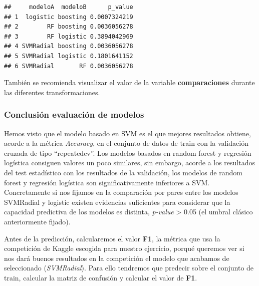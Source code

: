 \documentclass[]{article}
\newenvironment{Shaded}{\begin{snugshade}}{\end{snugshade}}
\newcommand{\DataTypeTok}[1]{\textcolor[rgb]{0.13,0.29,0.53}{#1}}
\newcommand{\KeywordTok}[1]{\textcolor[rgb]{0.13,0.29,0.53}{\textbf{#1}}}
\newcommand{\NormalTok}[1]{#1}
\newcommand{\OperatorTok}[1]{\textcolor[rgb]{0.81,0.36,0.00}{\textbf{#1}}}
\newcommand{\StringTok}[1]{\textcolor[rgb]{0.31,0.60,0.02}{#1}}
\begin{document}
\begin{verbatim}
##     modeloA  modeloB      p_value
## 1  logistic boosting 0.0007324219
## 2        RF boosting 0.0036056278
## 3        RF logistic 0.3894042969
## 4 SVMRadial boosting 0.0036056278
## 5 SVMRadial logistic 0.1801641152
## 6 SVMRadial       RF 0.0036056278
\end{verbatim}

También se recomienda visualizar el valor de la variable \textbf{comparaciones} durante las diferentes transformaciones.

\hypertarget{conclusiuxf3n-evaluaciuxf3n-de-modelos}{%
\subsubsection{Conclusión evaluación de
modelos}\label{conclusiuxf3n-evaluaciuxf3n-de-modelos}}

Hemos visto que el modelo basado en SVM es el que mejores
resultados obtiene, acorde a la métrica \emph{Accuracy}, en el
conjunto de datos de train con la validación cruzada de tipo ``repeatedcv''. Los
modelos basados en random forest y regresión logística
consiguen valores un poco similares, sin embargo, acorde a los resultados del test estadístico con los resultados de la validación, los modelos de random forest y regresión logística son significativamente inferiores a
SVM. Concretamente si nos fijamos en la comparación por pares entre los modelos
SVMRadial y logistic existen evidencias suficientes para
considerar que la capacidad predictiva de los modelos es distinta, 
\emph{p-value} \textgreater{} 0.05 (el umbral clásico anteriormente fijado).

Antes de la predicción, calcularemos el valor \textbf{F1}, la
métrica que usa la competición de Kaggle escogida para nuestro
ejercicio, porqué queremos ver si nos dará buenos resultados en la
competición el modelo que acabamos de seleccionado (\emph{SVMRadial}).
Para ello tendremos que predecir sobre el conjunto de train, calcular la
matriz de confusión y calcular el valor de \textbf{F1}.

\begin{Shaded}
\end{Shaded}
\end{document}
